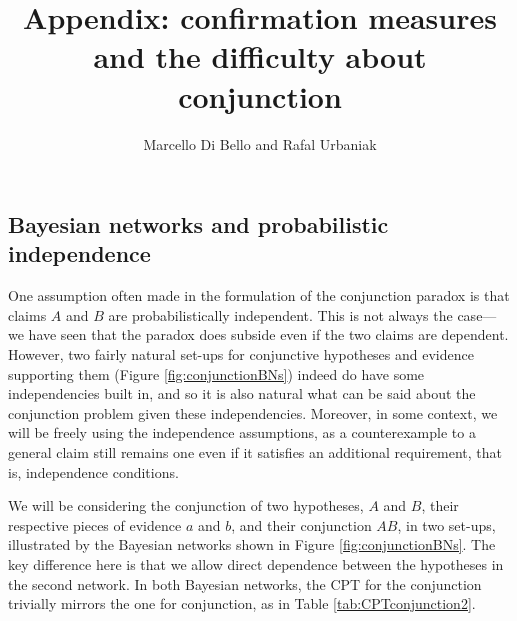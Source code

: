 \documentclass[
  10pt,
  dvipsnames,enabledeprecatedfontcommands]{scrartcl}
\title{Appendix: confirmation measures and the difficulty about
conjunction}
\author{Marcello Di Bello and Rafal Urbaniak}
\date{}
\begin{document}
\maketitle

\tableofcontents

\hypertarget{bayesian-networks-and-probabilistic-independence}{%
\subsection*{Bayesian networks and probabilistic
independence}\label{bayesian-networks-and-probabilistic-independence}}

One assumption often made in the formulation of the conjunction paradox
is that claims \(A\) and \(B\) are probabilistically independent. This
is not always the case---we have seen that the paradox does subside even
if the two claims are dependent. However, two fairly natural set-ups for
conjunctive hypotheses and evidence supporting them (Figure
\ref{fig:conjunctionBNs}) indeed do have some independencies built in,
and so it is also natural what can be said about the conjunction problem
given these independencies. Moreover, in some context, we will be freely
using the independence assumptions, as a counterexample to a general
claim still remains one even if it satisfies an additional requirement,
that is, independence conditions.

We will be considering the conjunction of two hypotheses, \(A\) and
\(B\), their respective pieces of evidence \(a\) and \(b\), and their
conjunction \(AB\), in two set-ups, illustrated by the Bayesian networks
shown in Figure \ref{fig:conjunctionBNs}. The key difference here is
that we allow direct dependence between the hypotheses in the second
network. In both Bayesian networks, the CPT for the conjunction
trivially mirrors the one for conjunction, as in Table
\ref{tab:CPTconjunction2}.

\vspace{1mm}
\footnotesize

\normalsize
\end{document}
